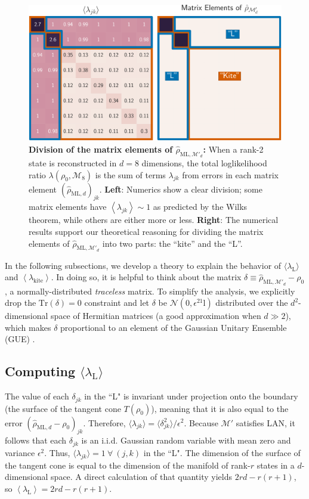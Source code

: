 \documentclass[aps,pra, twocolumn]{revtex4-1}
\newcommand{\M}{\mathcal{M}}
\newcommand{\Tr}{\mathrm{Tr}}
\newcommand{\Id}{\mathbb{I}}
\newcommand{\expect}[1]{\ensuremath{\left\langle#1\right\rangle}}
\def\Id{1\!\mathrm{l}}
\newcommand{\rhohat}{\hat{\rho}}
\newcommand{\rhoML}[1]{\rhohat_{\scriptscriptstyle{\mathrm{ML},#1}}}
\begin{document}
\begin{figure}
\includegraphics[width=\columnwidth]{Images/Figure_6.pdf}
 \caption{\textbf{Division of the matrix elements of $\rhoML{\M'_{d}}$:} When a rank-2 state is reconstructed in $d=8$ dimensions, the total loglikelihood ratio $\lambda(\rho_0,\mathcal{M}_8)$ is the sum of terms $\lambda_{jk}$ from errors in each matrix element $(\rhoML{d})_{jk}$.  \textbf{Left}:  Numerics show a clear division; some matrix elements have $\expect{\lambda_{jk}}\sim1$ as predicted by the Wilks theorem, while others are either more or less. \textbf{Right}:  The numerical results support our theoretical reasoning for dividing the matrix elements of $\rhoML{\M'_{d}}$ into two parts: the ``kite'' and the ``L''.}
\label{fig:L}
\end{figure}

In the following subsections, we develop a theory to explain the behavior of $\langle \lambda_{\mathrm{L}}\rangle$ and \expect{\lambda_{\mathrm{kite}}}.
In doing so, it is helpful to think about the matrix $\delta \equiv \rhoML{\M'_{d}}- \rho_{0}$, a normally-distributed \emph{traceless} matrix.  To simplify the analysis, we explicitly drop the $\Tr(\delta)=0$ constraint and let $\delta$ be $\mathcal{N}(0,\epsilon^2\Id)$ distributed over the $d^2$-dimensional space of Hermitian matrices (a good approximation when $d\gg2$), which makes $\delta$ proportional to an element of the Gaussian Unitary Ensemble (GUE) \cite{Fyodorov2005}.

\subsection{Computing $\langle \lambda_\mathrm{L}\rangle$}
\label{subsec:L}
The value of each $\delta_{jk}$ in the ``L" is invariant under projection onto the boundary (the surface of the tangent cone $T(\rho_{0})$), meaning that it is also equal to the error $(\rhoML{d} - \rho_{0})_{jk}$. Therefore,  $\langle \lambda_{jk} \rangle = \langle \delta_{jk}^{2}\rangle /\epsilon^{2}$. Because $\M'$ satisfies LAN, it follows that each $\delta_{jk}$ is an i.i.d. Gaussian random variable with mean zero and variance $\epsilon^{2}$. Thus, $\langle \lambda_{jk}\rangle = 1~\forall~(j,k)$ in the ``L". The dimension of the surface of the tangent cone is equal to the dimension of the manifold of rank-$r$ states in a $d$-dimensional space. A direct calculation of that quantity yields $2rd - r(r+1)$, so $\expect{\lambda_{\mathrm{L}}} = 2rd - r(r+1)$.
\end{document}
